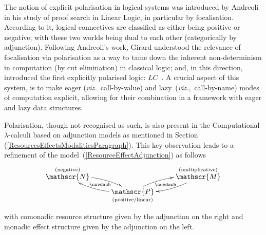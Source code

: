 \documentclass[11pt,twocolumn]{article}
\newcommand{\pref}[1]{\,(\ref{#1})}
\newcommand{\viz}{\emph{viz.}}
\newcommand{\LC}{\mbox{$LC$}}
\newcommand{\cat}[1]{\mathscr{#1}}
\begin{document}
The notion of explicit polarisation in logical systems was introduced by
Andreoli~\cite{Andreoli} in his study of proof search in Linear Logic, in
particular by focalisation.  According to it, logical connectives are
classified as either being positive or negative; with these two worlds
being dual to each other (categorically by adjunction).  Following
Andreoli's work, Girard understood the relevance of focalisation via
polarisation as a way to tame down the inherent non-determinism in
computation (by cut elimination) in classical logic; and, in this
direction, introduced the first explicitly polarised logic:
\LC~\cite{GirardLC}.  A crucial aspect of this system, is to make eager
(\viz~call-by-value) and lazy~(\viz,~call-by-name) modes of computation
explicit, allowing for their combination in a framework with eager and
lazy data structures.

Polarisation, though not recognised as such, is also present in the
Computational \mbox{$\lambda$-calculi} based on adjunction models as mentioned
in Section\pref{ResourcesEffectsModalitiesParagraph}.  This key
observation leads to a refinement of the
model~(\ref{ResourceEffectAdjunction}) as follows
  \begin{equation}\label{LCBPV}
  \begin{minipage}{\columnwidth}
  \xymatrix@R=5pt{
    & & 
    \\
    \ar@{}[u]|-{\text{\scriptsize(negative)}}
    \cat N \ar@/^.75em/[dr] & \ar@{}[rd]|-{\sevdash} \ar@{}[dl]|-{\swvdash} &
    \ar@/^.75em/[dl] \cat M \ar@{}[u]|-{\text{\scriptsize(multiplicative)}}\\
    & \ar@/^.75em/[lu] \cat P \ar@/^.75em/[ur]
    \ar@{}[d]|-{\txt{\scriptsize(positive/linear)}}& 
    \\ & & 
  }
\end{minipage}
\end{equation}
with comonadic resource structure given by the adjunction on the right and
monadic effect structure given by the adjunction on the left.
\end{document}
